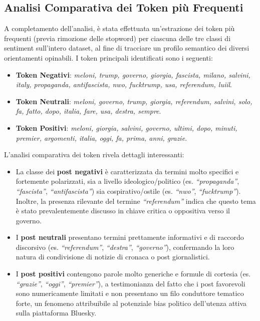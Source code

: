 \documentclass[11pt]{article}
\begin{document}
\subsection{Analisi Comparativa dei Token più Frequenti}
\label{sec:tokens}
A completamento dell'analisi, è stata effettuata un'estrazione dei token più frequenti (previa rimozione delle stopword) per ciascuna delle tre classi di sentiment sull'intero dataset, al fine di tracciare un profilo semantico dei diversi orientamenti opinabili. I token principali identificati sono i seguenti:
\begin{itemize}
    \item \textbf{Token Negativi}: \textit{meloni, trump, governo, giorgia, fascista, milano, salvini, italy, propaganda, antifascista, nwo, fucktrump, usa, referendum, luiil}.
    \item \textbf{Token Neutrali}: \textit{meloni, governo, trump, giorgia, referendum, salvini, solo, fa, fatto, dopo, italia, fare, usa, destra, sempre}.
    \item \textbf{Token Positivi}: \textit{meloni, giorgia, salvini, governo, ultimi, dopo, minuti, premier, argomenti, italia, oggi, fa, prima, anni, grazie}.
\end{itemize}

L'analisi comparativa dei token rivela dettagli interessanti:
\begin{itemize}
    \item La classe dei \textbf{post negativi} è caratterizzata da termini molto specifici e fortemente polarizzati, sia a livello ideologico/politico (es. \textit{``propaganda''}, \textit{``fascista''}, \textit{``antifascista''}) sia cospirativo/ostile (es. \textit{``nwo''}, \textit{``fucktrump''}). Inoltre, la presenza rilevante del termine \textit{``referendum''} indica che questo tema è stato prevalentemente discusso in chiave critica o oppositiva verso il governo.
    \item I \textbf{post neutrali} presentano termini prettamente informativi e di raccordo discorsivo (es. \textit{``referendum''}, \textit{``destra''}, \textit{``governo''}), confermando la loro natura di condivisione di notizie di cronaca o post giornalistici.
    \item I \textbf{post positivi} contengono parole molto generiche e formule di cortesia (es. \textit{``grazie''}, \textit{``oggi''}, \textit{``premier''}), a testimonianza del fatto che i post favorevoli sono numericamente limitati e non presentano un filo conduttore tematico forte, un fenomeno attribuibile al potenziale bias politico dell'utenza attiva sulla piattaforma Bluesky.
\end{itemize}
\end{document}
